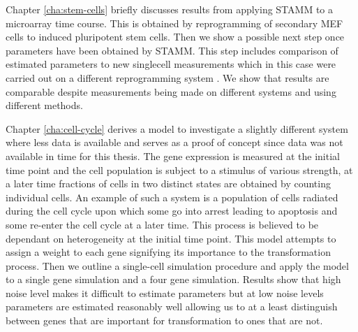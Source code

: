 Chapter \ref{cha:stem-cells} briefly discusses results from applying STAMM to a microarray time course. This is obtained by  reprogramming of secondary MEF cells to induced pluripotent stem cells. Then we show a possible next step once parameters have been obtained by STAMM. This step includes comparison of estimated parameters to new singlecell measurements which in this case were carried out on a different reprogramming system \citep{Buganim:2012hp}. We show that results are comparable despite measurements being made on different systems and using different methods.

Chapter \ref{cha:cell-cycle} derives a model to investigate a slightly different system where less data is available and serves as a proof of concept since data was not available in time for this thesis. The gene expression is measured at the initial time point and the cell population is subject to a stimulus of various strength, at a later time fractions of cells in two distinct states are obtained by counting individual cells. An example of such a system is a population of cells radiated during the cell cycle upon which some go into arrest leading to apoptosis and some re-enter the cell cycle at a later time. This process is believed to be dependant on heterogeneity at the initial time point. This model attempts to assign a weight to each gene signifying its importance to the transformation process. Then we outline a single-cell simulation procedure and apply the model to a single gene simulation and a four gene simulation. Results show that high noise level makes it difficult to estimate parameters but at low noise levels parameters are estimated reasonably well allowing us to at a least distinguish between genes that are important for transformation to ones that are not. 

